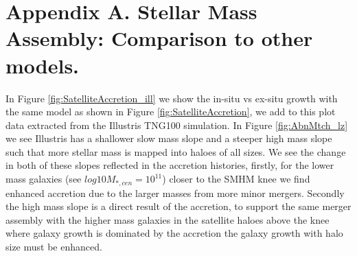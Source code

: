 
\chapter{Appendix A. Stellar Mass Assembly: Comparison to other models.}
\label{Appx:StellarMassAssembly}

In Figure \ref{fig:SatelliteAccretion_ill} we show the in-situ vs ex-situ growth with the same model as shown in Figure \ref{fig:SatelliteAccretion}, we add to this plot data extracted from the Illustris TNG100 simulation. In Figure \ref{fig:AbnMtch_lz} we see Illustris has a shallower slow mass slope and a steeper high mass slope such that more stellar mass is mapped into haloes of all sizes. We see the change in both of these slopes reflected in the accretion histories, firstly, for the lower mass galaxies (see $log 10 M_{*,cen} = 10^{11}$)  closer to the SMHM knee we find enhanced accretion due to the larger masses from more minor mergers. Secondly the high mass slope is a direct result of the accretion, to support the same merger assembly with the higher mass galaxies in the satellite haloes above the knee where galaxy growth is dominated by the accretion the galaxy growth with halo size must be enhanced.
 

